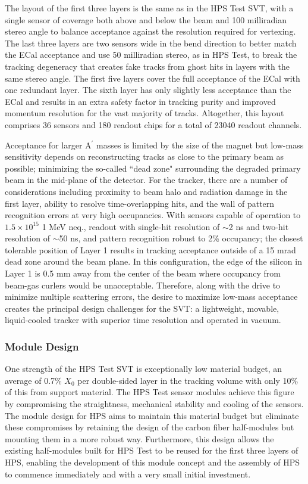 The layout of the first three layers is the same as in the HPS Test SVT, with a single sensor of coverage both above and below the beam and 100 milliradian stereo angle to balance acceptance against the resolution required for vertexing.  The last three layers are two sensors wide in the bend direction to better match the ECal acceptance and use 50 milliradian stereo, as in HPS Test, to break the tracking degeneracy that creates fake tracks from ghost hits in layers with the same stereo angle.  The first five layers cover the full acceptance of the ECal with one redundant layer.  The sixth layer has only slightly less acceptance than the ECal and results in an extra safety factor in tracking purity and improved momentum resolution for the vast majority of tracks.  Altogether, this layout comprises 36 sensors and 180 readout chips for a total of 23040 readout channels.

Acceptance for larger A$^\prime$ masses is limited by the size of the magnet but low-mass sensitivity depends on reconstructing tracks as close to the primary beam as possible; minimizing the so-called ``dead zone" surrounding the degraded primary beam in the mid-plane of the detector.  For the tracker, there are a number of considerations including proximity to beam halo and radiation damage in the first layer, ability to resolve time-overlapping hits, and the wall of pattern recognition errors at very high occupancies. With sensors capable of operation to $1.5 \times 10^{15}$ 1 MeV neq., readout with single-hit resolution of $\sim$2 ns and two-hit resolution of $\sim$50 ns, and pattern recognition robust to 2\% occupancy; the closest tolerable position of Layer 1 results in tracking acceptance outside of a 15 mrad dead zone around the beam plane.  In this configuration, the edge of the silicon in Layer 1 is 0.5 mm away from the center of the beam where occupancy from beam-gas curlers would be unacceptable. Therefore, along with the drive to minimize multiple scattering errors, the desire to maximize low-mass acceptance creates the principal design challenges for the SVT: a lightweight, movable, liquid-cooled tracker with superior time resolution and operated in vacuum.

\subsubsection{Module Design}

One strength of the HPS Test SVT is exceptionally low material budget, an average of 0.7\% $X_0$ per double-sided layer in the tracking volume with only 10\% of this from support material.  The HPS Test sensor modules achieve this figure by compromising the straightness, mechanical stability and cooling of the sensors.  The module design for HPS aims to maintain this material budget but eliminate these compromises by retaining the design of the carbon fiber half-modules but mounting them in a more robust way. Furthermore, this design allows the existing half-modules built for HPS Test to be reused for the first three layers of HPS, enabling the development of this module concept and the assembly of HPS to commence immediately and with a very small initial investment. 

